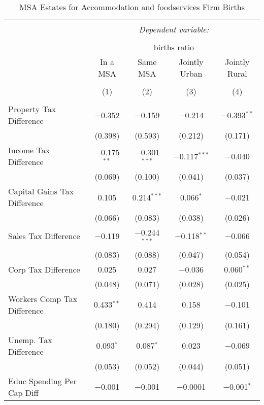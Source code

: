 
\begin{table}[!htbp] \centering 
  \caption{MSA Estates for  Accommodation and foodservices Firm Births} 
  \label{72metro} 
\begin{tabular}{@{\extracolsep{5pt}}lcccc} 
\\[-1.8ex]\hline 
\hline \\[-1.8ex] 
 & \multicolumn{4}{c}{\textit{Dependent variable:}} \\ 
\cline{2-5} 
\\[-1.8ex] & \multicolumn{4}{c}{births ratio} \\ 
 & In a MSA & Same MSA & Jointly Urban & Jointly Rural \\ 
\\[-1.8ex] & (1) & (2) & (3) & (4)\\ 
\hline \\[-1.8ex] 
 Property Tax Difference & $-$0.352 & $-$0.159 & $-$0.214 & $-$0.393$^{**}$ \\ 
  & (0.398) & (0.593) & (0.212) & (0.171) \\ 
  Income Tax Difference & $-$0.175$^{**}$ & $-$0.301$^{***}$ & $-$0.117$^{***}$ & $-$0.040 \\ 
  & (0.069) & (0.100) & (0.041) & (0.037) \\ 
  Capital Gains Tax Difference & 0.105 & 0.214$^{***}$ & 0.066$^{*}$ & $-$0.021 \\ 
  & (0.066) & (0.083) & (0.038) & (0.026) \\ 
  Sales Tax Difference & $-$0.119 & $-$0.244$^{***}$ & $-$0.118$^{**}$ & $-$0.066 \\ 
  & (0.083) & (0.088) & (0.047) & (0.054) \\ 
  Corp Tax Difference & 0.025 & 0.027 & $-$0.036 & 0.060$^{**}$ \\ 
  & (0.048) & (0.071) & (0.028) & (0.025) \\ 
  Workers Comp Tax Difference & 0.433$^{**}$ & 0.414 & 0.158 & $-$0.101 \\ 
  & (0.180) & (0.294) & (0.129) & (0.161) \\ 
  Unemp. Tax Difference & 0.093$^{*}$ & 0.087$^{*}$ & 0.023 & $-$0.069 \\ 
  & (0.053) & (0.052) & (0.044) & (0.051) \\ 
  Educ Spending Per Cap Diff & $-$0.001 & $-$0.001 & $-$0.0001 & $-$0.001$^{*}$ \\ 

\end{tabular}
\end{table}

